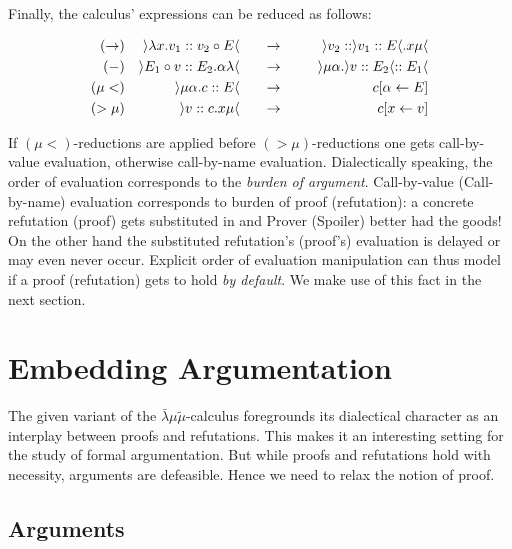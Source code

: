 \documentclass{ecai}
\newcommand{\matilda}{\bar{\lambda}\mu \tilde{\mu}}
\begin{document}
Finally, the calculus' expressions can be reduced as follows:

\begin{align*}
  (\rightarrow&) & \rangle \lambda x. v_1 :: v_2 \circ E \langle &\mathrel{\mkern30mu\rightarrow\mkern30mu}   &\rangle v_2 :  : \rangle v_1 :: E \langle . x \mu\langle \\
  (-&) & \rangle E_1 \circ v :: E_2.\alpha \lambda \langle &\mathrel{\mkern30mu\rightarrow\mkern30mu}  &\rangle \mu \alpha. \rangle v :: E_2 \langle :: E_1\langle \\
  (\mu<&) & \rangle \mu \alpha.c :: E \langle &\mathrel{\mkern30mu\rightarrow\mkern30mu} &c[\alpha \leftarrow E]\\
  (>\mu&) & \rangle v :: c.x\mu \langle &\mathrel{\mkern30mu\rightarrow\mkern30mu} &c[x \leftarrow v]                                                       
\end{align*}

If $(\mu<)$-reductions are applied before $(>\mu)$-reductions one gets call-by-value evaluation, otherwise call-by-name evaluation.
Dialectically speaking, the order of evaluation corresponds to the \emph{burden of argument}.
Call-by-value (Call-by-name) evaluation corresponds to burden of proof (refutation): a concrete refutation (proof) gets substituted in and Prover (Spoiler) better had the goods!
On the other hand the substituted refutation's (proof's) evaluation is delayed or may even never occur.
Explicit order of evaluation manipulation can thus model if a proof (refutation) gets to hold \emph{by default}.
We make use of this fact in the next section.

\section{Embedding Argumentation}

The given variant of the $\matilda$-calculus foregrounds its dialectical character as an interplay between proofs and refutations.
This makes it an interesting setting for the study of formal argumentation.
But while proofs and refutations hold with necessity, arguments are defeasible.
Hence we need to relax the notion of proof.

\subsection{Arguments}
\end{document}
